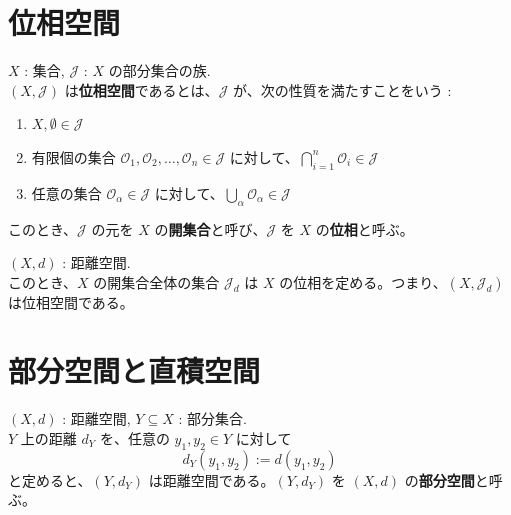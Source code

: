 \documentclass[article,paper=a4paper]{jlreq}
\begin{document}
\section{位相空間}

\begin{dfn}
    \quad $X$ : 集合, $\mathcal{J}$ : $X$ の部分集合の族.\\
    $(X, \mathcal{J})$ は\textbf{位相空間}であるとは、$\mathcal{J}$ が、次の性質を満たすことをいう :
\begin{enumerate}[label=(\arabic*)\,]
    \item $X, \emptyset \in \mathcal{J}$
    \item 有限個の集合 $\mathcal{O}_1, \mathcal{O}_2, \ldots, \mathcal{O}_n \in \mathcal{J}$ に対して、$\bigcap_{i=1}^n \mathcal{O}_i \in \mathcal{J}$
    \item 任意の集合 $\mathcal{O}_\alpha \in \mathcal{J}$ に対して、$\bigcup_{\alpha} \mathcal{O}_\alpha \in \mathcal{J}$
\end{enumerate}
このとき、$\mathcal{J}$ の元を $X$ の\textbf{開集合}と呼び、$\mathcal{J}$ を $X$ の\textbf{位相}と呼ぶ。
\end{dfn}

\begin{ex}
    \quad $(X,d)$ : 距離空間.\\
    このとき、$X$ の開集合全体の集合 $\mathcal{J}_d$ は $X$ の位相を定める。つまり、$(X, \mathcal{J}_d)$ は位相空間である。
\end{ex}

\section{部分空間と直積空間}

\begin{dfn}
    \quad $(X,d)$ : 距離空間, $Y \subseteq X$ : 部分集合.\\
    $Y$ 上の距離 $d_Y$ を、任意の $y_1, y_2 \in Y$ に対して 
    \[d_Y(y_1,y_2) := d(y_1,y_2)\]
    と定めると、$(Y, d_Y)$ は距離空間である。$(Y, d_Y)$ を $(X,d)$ の\textbf{部分空間}と呼ぶ。
\end{dfn}
\end{document}
